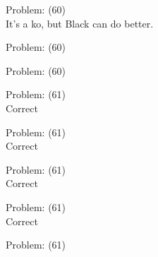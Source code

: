 \documentclass[11pt]{article}
\begin{document}
\begin{minipage}[t]{0.5\textwidth}
  {\centering
  
  Problem: (60)\\
  It's a ko, but Black can do better.\\
  }
\end{minipage}
\begin{minipage}[t]{0.5\textwidth}
  {\centering
  
  Problem: (60)\\
  
  }
\end{minipage}
\begin{minipage}[t]{0.5\textwidth}
  {\centering
  
  Problem: (60)\\
  
  }
\end{minipage}
\begin{minipage}[t]{0.5\textwidth}
  {\centering
  
  Problem: (61)\\
  Correct\\
  }
\end{minipage}
\begin{minipage}[t]{0.5\textwidth}
  {\centering
  
  Problem: (61)\\
  Correct\\
  }
\end{minipage}
\begin{minipage}[t]{0.5\textwidth}
  {\centering
  
  Problem: (61)\\
  Correct\\
  }
\end{minipage}
\begin{minipage}[t]{0.5\textwidth}
  {\centering
  
  Problem: (61)\\
  Correct\\
  }
\end{minipage}
\begin{minipage}[t]{0.5\textwidth}
  {\centering
  
  Problem: (61)\\
  
  }
\end{minipage}
\end{document}
